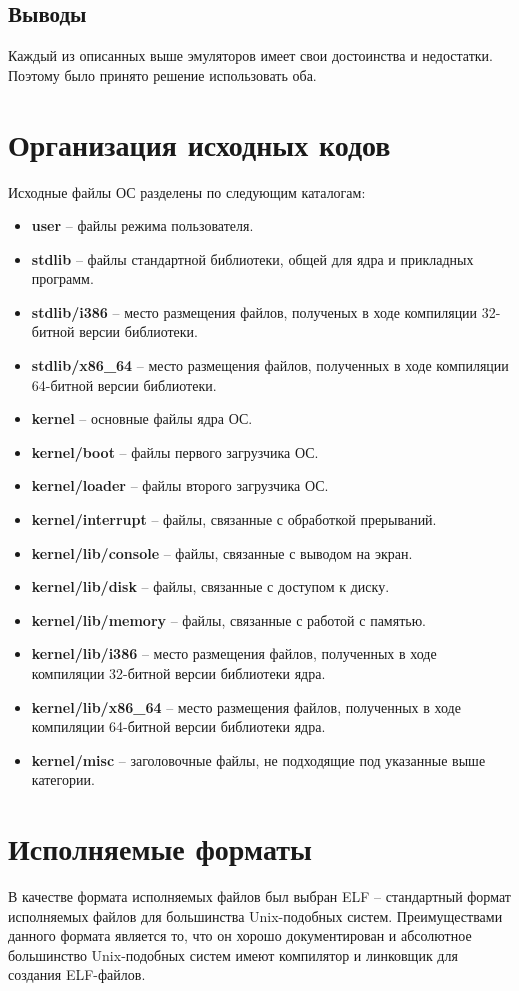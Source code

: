 \subsection{Выводы}
Каждый из описанных выше эмуляторов имеет свои достоинства и недостатки. Поэтому
было принято решение использовать оба.

\section{Организация исходных кодов}
Исходные файлы ОС разделены по следующим каталогам:
\begin{itemize}
\item \textbf{user} -- файлы режима пользователя.
\item \textbf{stdlib} -- файлы стандартной библиотеки, общей для ядра и прикладных программ.
\item \textbf{stdlib/i386} -- место размещения файлов, полученых в ходе компиляции 32-битной
	версии библиотеки.
\item \textbf{stdlib/x86\_64} -- место размещения файлов, полученных в ходе компиляции 64-битной
	версии библиотеки.
\item \textbf{kernel} -- основные файлы ядра ОС.
\item \textbf{kernel/boot} -- файлы первого загрузчика ОС.
\item \textbf{kernel/loader} -- файлы второго загрузчика ОС.
\item \textbf{kernel/interrupt} -- файлы, связанные с обработкой прерываний.
\item \textbf{kernel/lib/console} -- файлы, связанные с выводом на экран.
\item \textbf{kernel/lib/disk} -- файлы, связанные с доступом к диску.
\item \textbf{kernel/lib/memory} -- файлы, связанные с работой с памятью.
\item \textbf{kernel/lib/i386} -- место размещения файлов, полученных в ходе компиляции 32-битной
	версии библиотеки ядра.
\item \textbf{kernel/lib/x86\_64} -- место размещения файлов, полученных в ходе компиляции 64-битной
	версии библиотеки ядра.
\item \textbf{kernel/misc} -- заголовочные файлы, не подходящие под указанные выше категории.
\end{itemize}

\section{Исполняемые форматы}
В качестве формата исполняемых файлов был выбран ELF -- стандартный формат исполняемых файлов
для большинства Unix-подобных систем. Преимуществами данного формата является то, что он хорошо
документирован и абсолютное большинство Unix-подобных систем имеют компилятор и линковщик для
создания ELF-файлов.

